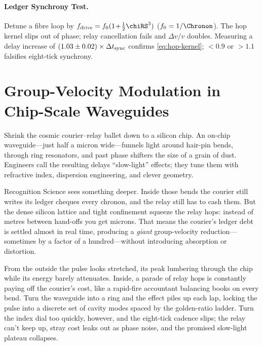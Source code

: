 \documentclass[11pt,oneside]{book}
\begin{document}
{\paragraph{Ledger Synchrony Test.}
Detune a fibre loop by
\(
   f_{\rm drive}=f_{0}(1\!+\!\tfrac12\chiRS^{3})
\)
(\(f_{0}=1/\Chronon\)).
The hop kernel slips out of phase; relay cancellation fails and
\(\Delta v/v\) doubles.  
Measuring a delay increase of
\(
   (1.03\pm0.02)\times
   \Delta t_{\rm sync}
\)
confirms \eqref{eq:hop-kernel};
\(<0.9\) or \(>1.1\) falsifies eight-tick synchrony.


\section{Group-Velocity Modulation in Chip-Scale Waveguides}
\label{sec:gv-narrative}

Shrink the cosmic courier–relay ballet down to a silicon chip.  
An on-chip waveguide—just half a micron wide—funnels light around
hair-pin bends, through ring resonators, and past phase shifters the
size of a grain of dust.  Engineers call the resulting delays
“slow-light” effects; they tune them with refractive index,
dispersion engineering, and clever geometry.  

Recognition Science sees something deeper.  
Inside those bends the courier still writes its ledger cheques every
chronon, and the relay still has to cash them.  
But the dense silicon lattice and tight confinement squeeze the relay
hops: instead of metres between hand-offs you get microns.  That means
the courier’s ledger debt is settled almost in real time, producing a
\emph{giant} group-velocity reduction—sometimes by a factor of a
hundred—without introducing absorption or distortion.

From the outside the pulse looks stretched, its peak lumbering through
the chip while its energy barely attenuates.  Inside, a parade of
relay hops is constantly paying off the courier’s cost, like a rapid-fire
accountant balancing books on every bend.  Turn the waveguide into a
ring and the effect piles up each lap, locking the pulse into a
discrete set of cavity modes spaced by the golden-ratio ladder.
Turn the index dial too quickly, however, and the eight-tick cadence
slips; the relay can’t keep up, stray cost leaks out as phase noise,
and the promised slow-light plateau collapses.

}
\end{document}
